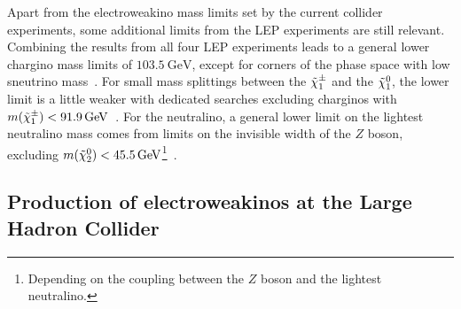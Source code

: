 Apart from the electroweakino mass limits set by the current collider experiments, some additional limits from the LEP experiments are still relevant. Combining the results from all four LEP experiments leads to a general lower chargino mass limits of $\SI{103.5}{\GeV}$, except for corners of the phase space with low sneutrino mass~\cite{lep_susy_results}. For small mass splittings between the $\tilde{\chi}_1^\pm$ and the $\tilde{\chi}_1^0$, the lower limit is a little weaker with dedicated searches excluding charginos with $m(\charg) < \SI{91.9}{\GeV}$~\cite{lep_susy_results}. For the neutralino, a general lower limit on the lightest neutralino mass comes from limits on the invisible width of the $Z$ boson, excluding $m(\neutr) < \SI{45.5}{\GeV}$\footnote{Depending on the coupling between the $Z$ boson and the lightest neutralino.}~\cite{pdg2020}.

\subsection{Production of electroweakinos at the Large Hadron Collider}


